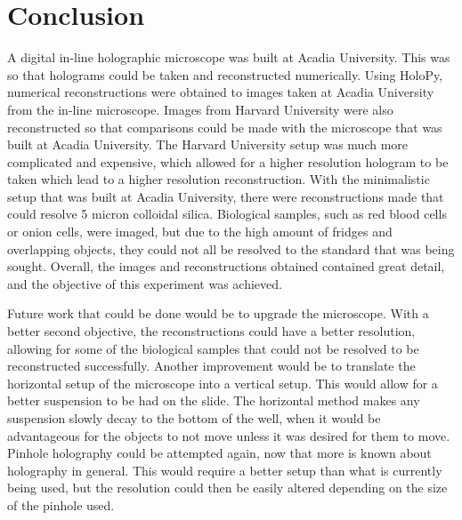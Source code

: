 %
%
\chapter{Conclusion} \label{chap:Conclusion}

A digital in-line holographic microscope was built at Acadia University. This
was so that holograms could be taken and reconstructed numerically.
Using HoloPy, numerical reconstructions were obtained to images taken at Acadia
University from the in-line microscope.
Images from Harvard
University were also reconstructed so that comparisons could be made with the
microscope that was built at Acadia University. The Harvard University setup
was much more complicated and expensive, which allowed for a higher resolution
hologram to be taken which lead to a higher resolution reconstruction. With the
minimalistic setup that was built at Acadia University, there were
reconstructions made that could resolve 5 micron colloidal silica. Biological
samples, such as red blood cells or onion cells, were imaged, but due to the high amount of
fridges and overlapping objects, they could not all be resolved to the standard
that was being sought. Overall, the images and reconstructions obtained
contained great detail, and the objective of this experiment was achieved.

Future work that could be done would be to upgrade the microscope. With a
better second objective, the reconstructions could have a better resolution,
allowing for some of the biological samples that could not be resolved to be
reconstructed successfully. Another improvement would be to translate the
horizontal setup of the microscope into a vertical setup. This would allow for
a better suspension to be had on the slide. The horizontal method makes any
suspension slowly decay to the bottom of the well, when it would be
advantageous for the objects to not move unless it was desired for them to
move. Pinhole holography could be attempted again, now that more is known about
holography in general. This would require a better setup than what is currently
being used, but the resolution could then be easily altered depending on the
size of the pinhole used.


%
